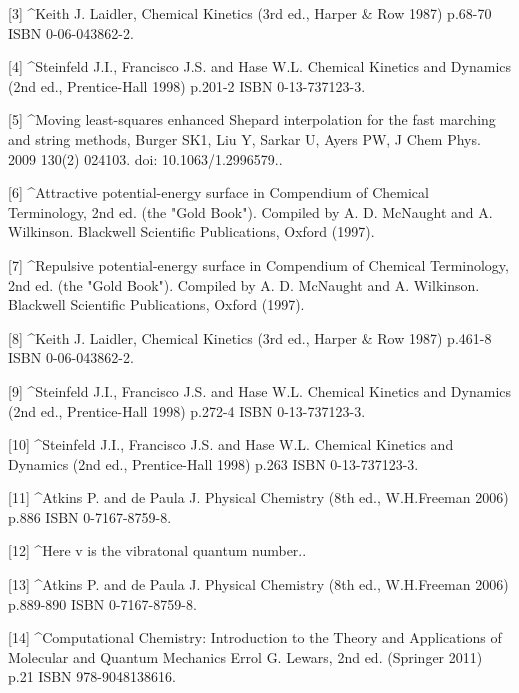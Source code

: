 [3]
^Keith J. Laidler, Chemical Kinetics (3rd ed., Harper & Row 1987) p.68-70 ISBN 0-06-043862-2.

[4]
^Steinfeld J.I., Francisco J.S. and Hase W.L. Chemical Kinetics and Dynamics (2nd ed., Prentice-Hall 1998) p.201-2 ISBN 0-13-737123-3.

[5]
^Moving least-squares enhanced Shepard interpolation for the fast marching and string methods, Burger SK1, Liu Y, Sarkar U, Ayers PW, J Chem Phys. 2009 130(2) 024103. doi: 10.1063/1.2996579..

[6]
^Attractive potential-energy surface in Compendium of Chemical Terminology, 2nd ed. (the "Gold Book"). Compiled by A. D. McNaught and A. Wilkinson. Blackwell Scientific Publications, Oxford (1997).

[7]
^Repulsive potential-energy surface in Compendium of Chemical Terminology, 2nd ed. (the "Gold Book"). Compiled by A. D. McNaught and A. Wilkinson. Blackwell Scientific Publications, Oxford (1997).

[8]
^Keith J. Laidler, Chemical Kinetics (3rd ed., Harper & Row 1987) p.461-8 ISBN 0-06-043862-2.

[9]
^Steinfeld J.I., Francisco J.S. and Hase W.L. Chemical Kinetics and Dynamics (2nd ed., Prentice-Hall 1998) p.272-4 ISBN 0-13-737123-3.

[10]
^Steinfeld J.I., Francisco J.S. and Hase W.L. Chemical Kinetics and Dynamics (2nd ed., Prentice-Hall 1998) p.263 ISBN 0-13-737123-3.

[11]
^Atkins P. and de Paula J. Physical Chemistry (8th ed., W.H.Freeman 2006) p.886 ISBN 0-7167-8759-8.

[12]
^Here v is the vibratonal quantum number..

[13]
^Atkins P. and de Paula J. Physical Chemistry (8th ed., W.H.Freeman 2006) p.889-890 ISBN 0-7167-8759-8.

[14]
^Computational Chemistry: Introduction to the Theory and Applications of Molecular and Quantum Mechanics Errol G. Lewars, 2nd ed. (Springer 2011) p.21 ISBN 978-9048138616.
